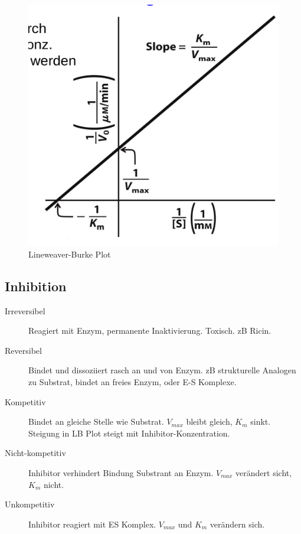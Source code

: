 \documentclass[a4paper,twocolumn,english,fontsize=7,DIV=16]{scrartcl}
\begin{document}
\begin{figure}
	\centering
	\includegraphics[width=\linewidth]{img/lb.png}
	\caption{Lineweaver-Burke Plot}
\end{figure}

\subsection{Inhibition}

\begin{description}
	\item[Irreversibel] Reagiert mit Enzym, permanente Inaktivierung.
		Toxisch. zB Ricin.
	\item[Reversibel] Bindet und dissoziiert rasch an und von Enzym. zB
		strukturelle Analogen zu Substrat, bindet an freies Enzym, oder
		E-S Komplexe.
	\item[Kompetitiv] Bindet an gleiche Stelle wie Substrat. $V_{max}$
		bleibt gleich, $K_m$ sinkt. Steigung in LB Plot steigt mit
		Inhibitor-Konzentration.
	\item[Nicht-kompetitiv] Inhibitor verhindert Bindung Substrant an
		Enzym. $V_{max}$ verändert sicht, $K_m$ nicht.
	\item[Unkompetitiv] Inhibitor reagiert mit ES Komplex. $V_{max}$ und
		$K_m$ verändern sich.
\end{description}
\end{document}
